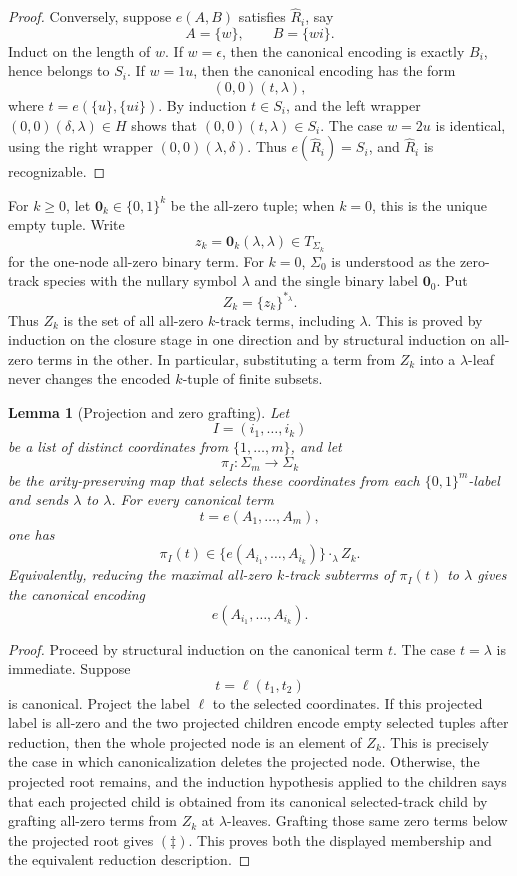 \documentclass[11pt]{article}
\newtheorem{lemma}[theorem]{Lemma}
\theoremstyle{definition}
\newcommand{\Term}[1]{T_{#1}}
\begin{document}
\begin{proof}
Conversely, suppose \(e(A,B)\) satisfies \(\widehat R_i\), say
\[
  A=\{w\},\qquad B=\{wi\}.
\]
Induct on the length of \(w\).  If \(w=\epsilon\), then the canonical encoding is
exactly \(B_i\), hence belongs to \(S_i\).  If \(w=1u\), then the canonical
encoding has the form
\[
  (0,0)(t,\lambda),
\]
where \(t=e(\{u\},\{ui\})\).  By induction \(t\in S_i\), and the left wrapper
\((0,0)(\delta,\lambda)\in H\) shows that
\((0,0)(t,\lambda)\in S_i\).  The case \(w=2u\) is identical, using the right
wrapper \((0,0)(\lambda,\delta)\).  Thus \(e(\widehat R_i)=S_i\), and
\(\widehat R_i\) is recognizable.
\end{proof}

\noindent
For \(k\ge 0\), let \(\mathbf 0_k\in\{0,1\}^k\) be the all-zero tuple; when
\(k=0\), this is the unique empty tuple.  Write
\[
  z_k=\mathbf 0_k(\lambda,\lambda)\in\Term{\Sigma_k}
\]
for the one-node all-zero binary term.  For \(k=0\), \(\Sigma_0\) is understood
as the zero-track species with the nullary symbol \(\lambda\) and the single
binary label \(\mathbf 0_0\).  Put
\[
  Z_k=\{z_k\}^{*_\lambda}.
\]
Thus \(Z_k\) is the set of all all-zero \(k\)-track terms, including
\(\lambda\).  This is proved by induction on the closure stage in one direction
and by structural induction on all-zero terms in the other.  In particular,
substituting a term from \(Z_k\) into a \(\lambda\)-leaf never changes the
encoded \(k\)-tuple of finite subsets.

\begin{lemma}[Projection and zero grafting]\label{lem:tw-zero-graft}
Let
\[
  I=(i_1,\ldots,i_k)
\]
be a list of distinct coordinates from \(\{1,\ldots,m\}\), and let
\[
  \pi_I:\Sigma_m\to\Sigma_k
\]
be the arity-preserving map that selects these coordinates from each
\(\{0,1\}^m\)-label and sends \(\lambda\) to \(\lambda\).  For every canonical
term
\[
  t=e(A_1,\ldots,A_m),
\]
one has
\[
  \pi_I(t)\in
  \{e(A_{i_1},\ldots,A_{i_k})\}\cdot_\lambda Z_k.       \tag{\(\ddagger\)}
\]
Equivalently, reducing the maximal all-zero \(k\)-track subterms of
\(\pi_I(t)\) to \(\lambda\) gives the canonical encoding
\[
  e(A_{i_1},\ldots,A_{i_k}).
\]
\end{lemma}

\begin{proof}
Proceed by structural induction on the canonical term \(t\).  The case
\(t=\lambda\) is immediate.  Suppose
\[
  t=\ell(t_1,t_2)
\]
is canonical.  Project the label \(\ell\) to the selected coordinates.  If this
projected label is all-zero and the two projected children encode empty
selected tuples after reduction, then the whole projected node is an element of
\(Z_k\).  This is precisely the case in which canonicalization deletes the
projected node.  Otherwise, the projected root remains, and the induction
hypothesis applied to the children says that each projected child is obtained
from its canonical selected-track child by grafting all-zero terms from
\(Z_k\) at \(\lambda\)-leaves.  Grafting those same zero terms below the
projected root gives \((\ddagger)\).  This proves both the displayed membership
and the equivalent reduction description.
\end{proof}
\end{document}
